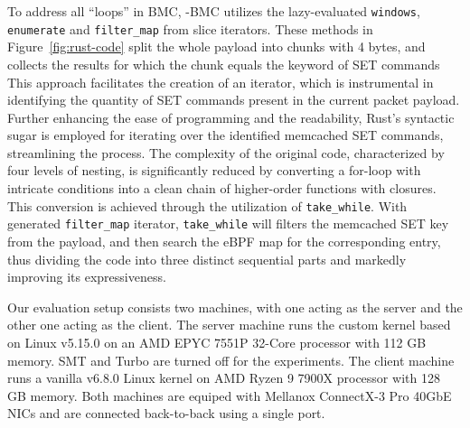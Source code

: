 
To address all ``loops'' in BMC, \projname{}-BMC utilizes the lazy-evaluated
    \texttt{windows}, \texttt{enumerate} and \texttt{filter\_map} from slice iterators.
These methods in Figure~\ref{fig:rust-code} split the whole payload into chunks
    with 4 bytes, and collects the results for which the chunk equals the keyword
    of SET commands
This approach facilitates the creation of an iterator, which is instrumental in identifying
    the quantity of SET commands present in the current packet payload.
Further enhancing the ease of programming and the readability, Rust's syntactic sugar is employed for
    iterating over the identified memcached SET commands, streamlining the process.
The complexity of the original code, characterized by four levels of nesting,
    is significantly reduced by converting a for-loop with intricate conditions
    into a clean chain of higher-order functions with closures.
This conversion is achieved through the utilization of \texttt{take\_while}.
    With generated \texttt{filter\_map} iterator, \texttt{take\_while} will
    filters the memcached SET key from the payload, and then search the eBPF map for
    the corresponding entry, thus dividing the code into three distinct
    sequential parts and markedly improving its expressiveness.


Our evaluation setup consists two machines, with one
    acting as the server and the other one acting as the client.
The server machine runs the \projname{} custom kernel based on Linux v5.15.0 on
    an AMD EPYC 7551P 32-Core processor with 112 GB memory.
SMT and Turbo are turned off for the experiments.
The client machine runs a vanilla v6.8.0 Linux kernel on AMD Ryzen 9 7900X
    processor with 128 GB memory.
Both machines are equiped with Mellanox ConnectX-3 Pro 40GbE NICs and are
    connected back-to-back using a single port.

